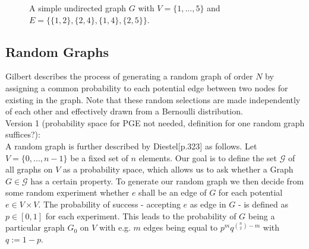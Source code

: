 \begin{figure}[h]
    \centering
    \caption{A simple undirected graph $G$ with $V=\{1,...,5\}$ and $E=\{\{1,2\},\{2,4\},\{1,4\},\{2,5\}\}$.}
    \label{fig:graph-example}
\end{figure}

\subsection{Random Graphs}
Gilbert\cite{gilbert1959random} describes the process of generating a random graph of order $N$ by assigning a common probability to each potential edge between two nodes for existing in the graph. Note that these random selections are made independently of each other and effectively drawn from a Bernoulli distribution. \\
Version 1 (probability space for PGE not needed, definition for one random graph suffices?): \\
A random graph is further described by Diestel\cite{Diestel2017}[p.323] as follows. Let $V = \{0,...,n-1\}$ be a fixed set of $n$ elements. Our goal is to define the set $\mathcal{G}$ of all graphs on $V$ as a probability space, which allows us to ask whether a Graph $G \in \mathcal{G}$ has a certain property. To generate our random graph we then decide from some random experiment whether $e$ shall be an edge of $G$ for each potential $e \in V \times V$. The probability of success - accepting $e$ as edge in $G$ - is defined as $p \in [0,1]$ for each experiment. This leads to the probability of $G$ being a particular graph $G_0$ on $V$ with e.g. $m$ edges being equal to $p^m q^{\binom{n}{2}-m}$ with $q:=1-p$.
\bigskip

